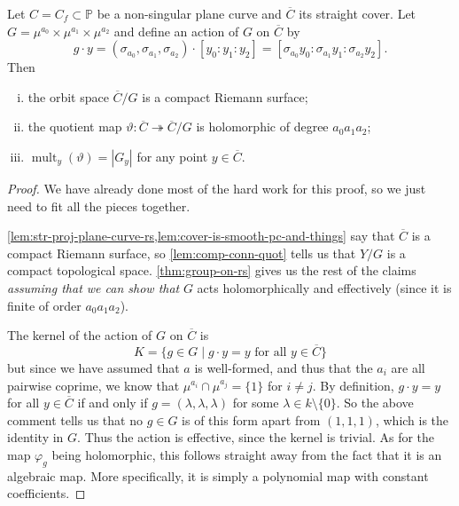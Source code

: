 \documentclass[10pt,notitlepage]{article}
\numberwithin{equation}{subsection}
\DeclareMathOperator{\mult}{mult}
\newcommand{\pee}{\mathbb{P}}
\newcommand{\noz}{\setminus\{0\}}
\newcommand{\cover}[1]{\overline{#1}}
\begin{document}
        \begin{lemma}\label{lem:quotient-of-cover}
            Let $C=C_f\subset\pee$ be a non-singular plane curve and $\cover{C}$ its straight cover.
            Let $G=\mu^{a_0}\times\mu^{a_1}\times\mu^{a_2}$ and define an action of $G$ on $\cover{C}$ by
            \[
                g\cdot y = (\sigma_{a_0},\sigma_{a_1},\sigma_{a_2})\cdot [y_0:y_1:y_2] = [\sigma_{a_0}y_0:\sigma_{a_1}y_1:\sigma_{a_2}y_2].
            \]
            Then
            \begin{enumerate}[(i)]
                \item the orbit space $\cover{C}/G$ is a compact Riemann surface;
                \item the quotient map $\vartheta\colon \cover{C}\twoheadrightarrow\cover{C}/G$ is holomorphic of degree $a_0a_1a_2$;
                \item $\mult_y(\vartheta)=|G_y|$ for any point $y\in\cover{C}$.\qedhere
            \end{enumerate}
        \end{lemma}

        \begin{proof}
            We have already done most of the hard work for this proof, so we just need to fit all the pieces together.

            \cref{lem:str-proj-plane-curve-rs,lem:cover-is-smooth-pc-and-things} say that $\cover{C}$ is a compact Riemann surface, so \cref{lem:comp-conn-quot} tells us that $Y/G$ is a compact topological space.
            \cref{thm:group-on-rs} gives us the rest of the claims \emph{assuming that we can show that} $G$ acts holomorphically and effectively (since it is finite of order $a_0a_1a_2$).

            The kernel of the action of $G$ on $\cover{C}$ is
            \[
                K = \{g\in G\mid g\cdot y = y\text{ for all }y\in \cover{C}\}
            \]
            but since we have assumed that $a$ is well-formed, and thus that the $a_i$ are all pairwise coprime, we know that $\mu^{a_i}\cap\mu^{a_j}=\{1\}$ for $i\neq j$.
            By definition, $g\cdot y=y$ for all $y\in\cover{C}$ if and only if $g=(\lambda,\lambda,\lambda)$ for some $\lambda\in k\noz$.
            So the above comment tells us that no $g\in G$ is of this form apart from $(1,1,1)$, which is the identity in $G$.
            Thus the action is effective, since the kernel is trivial.
            As for the map $\varphi_g$ being holomorphic, this follows straight away from the fact that it is an algebraic map.
            More specifically, it is simply a polynomial map with constant coefficients.
        \end{proof}
\end{document}
